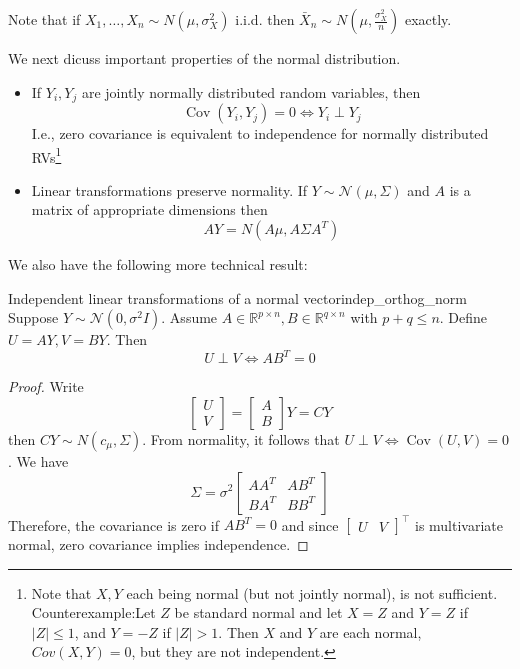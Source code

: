 \documentclass[11pt, %
	oneside, %
	english, %
	onehalfspacing, %
	]{article} %
\numberwithin{equation}{section}
\begin{document}
Note that if $X_1, \ldots, X_n \sim N\left(\mu, \sigma_X^2\right)$ i.i.d. then  $\bar{X}_n \sim N\left(\mu, \frac{\sigma_X^2}{n}\right)$ exactly.

We next dicuss important properties of the normal distribution.

\begin{itemize}
    \item If $Y_i, Y_j$ are jointly normally distributed random variables, then
    \begin{equation*}
        \operatorname{Cov}(Y_i, Y_j) = 0 \iff Y_i \perp Y_j
    \end{equation*}
    I.e., zero covariance is equivalent to independence for normally distributed RVs\footnote{Note that $X,Y$ each being normal (but not jointly normal), is not sufficient. Counterexample:Let $Z$ be standard normal and let $X = Z$ and $Y = Z$ if $|Z| \leq 1$, and $Y = -Z$ if $|Z| > 1$. Then $X$ and $Y$ are each normal, $Cov(X,Y) = 0$, but they are not independent.}
    \item Linear transformations preserve normality. If $Y \sim \mathcal{N}(\mu, \Sigma)$ and $A$ is a matrix of appropriate dimensions then
    \begin{equation*}
        A Y = N(A \mu, A \Sigma A^T)
    \end{equation*}
\end{itemize}

We also have the following more technical result:

\begin{lemma}{Independent linear transformations of a normal vector}{indep_orthog_norm}
    Suppose $Y \sim \mathcal{N}(0, \sigma^2 I)$. Assume $A \in \mathbb{R}^{p \times n}, B \in \mathbb{R}^{q \times n}$ with $p + q \leq n$. Define $U = AY, V = BY$. Then
    $$
    U \perp V \iff AB^T = 0
    $$
\end{lemma}

\begin{proof}
    Write
    $$
    \begin{bmatrix}
    U \\
    V
    \end{bmatrix}
    =
    \begin{bmatrix}
        A \\
        B
        \end{bmatrix} Y
    = CY
    $$
    then $CY \sim N(c_\mu, \Sigma)$. From normality, it follows that $U \perp V \iff \operatorname{Cov} \left( U, V\right) = 0$. We have
    $$
    \Sigma = \sigma^2 \begin{bmatrix}
    AA^T & A B^T  \\
    B A^T & B B^T
    \end{bmatrix}
    $$
    Therefore, the covariance is zero if $A B^T = 0$ and since $\begin{bmatrix} U & V  \end{bmatrix}^\top$ is multivariate normal, zero covariance implies independence.
\end{proof}
\end{document}
